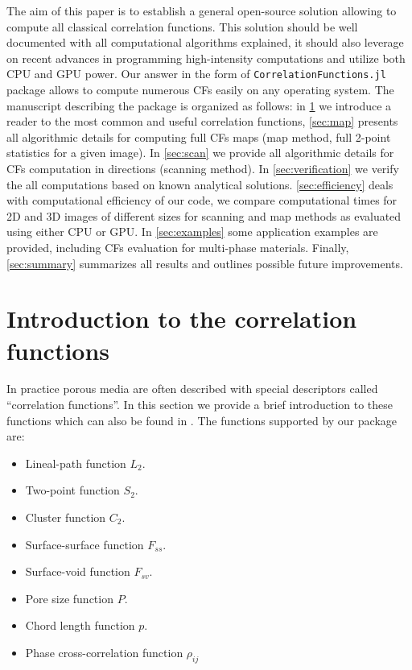 \documentclass[reprint,amsmath,amssymb,aps,pre,showkeys,showpacs,nofootinbib]{revtex4-1}
\newcommand{\code}[1]{\colorbox{light-gray}{\texttt{#1}}}
\begin{document}
The aim of this paper is to establish a general open-source solution allowing to
compute all classical correlation functions. This solution should be well
documented with all computational algorithms explained, it should also leverage
on recent advances in programming high-intensity computations and utilize both
CPU and GPU power. Our answer in the form of \code{CorrelationFunctions.jl}
package allows to compute numerous CFs easily on any operating system. The
manuscript describing the package is organized as follows: in \cref{sec:math} we
introduce a reader to the most common and useful correlation functions,
\cref{sec:map} presents all algorithmic details for computing full CFs maps (map
method, full 2-point statistics for a given image). In \cref{sec:scan} we
provide all algorithmic details for CFs computation in directions (scanning
method). In \cref{sec:verification} we verify the all computations based on
known analytical solutions. \cref{sec:efficiency} deals with computational
efficiency of our code, we compare computational times for 2D and 3D images of
different sizes for scanning and map methods as evaluated using either CPU or
GPU. In \cref{sec:examples} some application examples are provided, including
CFs evaluation for multi-phase materials. Finally, \cref{sec:summary} summarizes
all results and outlines possible future improvements.

\section{Introduction to the correlation functions}
\label{sec:math}
In practice porous media are often described with special descriptors called
``correlation functions''. In this section we provide a brief introduction to
these functions which can also be found in \cite{Torquato_book}. The functions
supported by our package are:
\begin{itemize}
\item Lineal-path function $L_2$.
\item Two-point function $S_2$.
\item Cluster function $C_2$.
\item Surface-surface function $F_{ss}$.
\item Surface-void function $F_{sv}$.
\item Pore size function $P$.
\item Chord length function $p$.
\item Phase cross-correlation function $\rho_{ij}$
\end{itemize}
\end{document}
